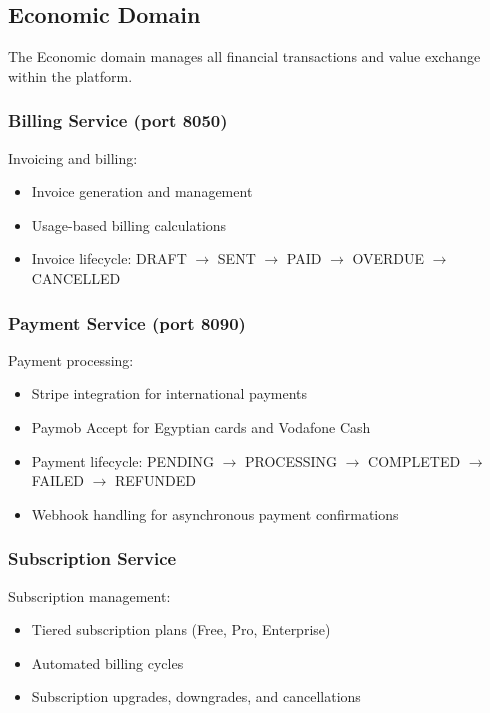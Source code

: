 \documentclass[11pt,a4paper]{article}
\begin{document}
\subsection{Economic Domain}

The Economic domain manages all financial transactions and value exchange within the platform.

\subsubsection{Billing Service (port 8050)}

Invoicing and billing:
\begin{itemize}
  \item Invoice generation and management
  \item Usage-based billing calculations
  \item Invoice lifecycle: DRAFT $\rightarrow$ SENT $\rightarrow$ PAID $\rightarrow$ OVERDUE $\rightarrow$ CANCELLED
\end{itemize}

\subsubsection{Payment Service (port 8090)}

Payment processing:
\begin{itemize}
  \item Stripe integration for international payments
  \item Paymob Accept for Egyptian cards and Vodafone Cash
  \item Payment lifecycle: PENDING $\rightarrow$ PROCESSING $\rightarrow$ COMPLETED $\rightarrow$ FAILED $\rightarrow$ REFUNDED
  \item Webhook handling for asynchronous payment confirmations
\end{itemize}

\subsubsection{Subscription Service}

Subscription management:
\begin{itemize}
  \item Tiered subscription plans (Free, Pro, Enterprise)
  \item Automated billing cycles
  \item Subscription upgrades, downgrades, and cancellations
\end{itemize}
\end{document}
